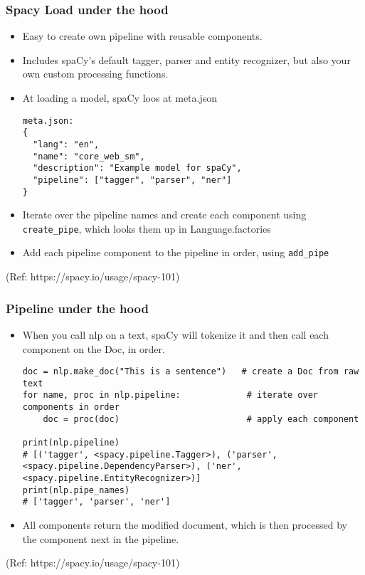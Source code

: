 \begin{frame}[fragile]\frametitle{Spacy Load under the hood}
  \begin{itemize}
    \item Easy to create own pipeline with reusable components.
		\item Includes spaCy’s default tagger, parser and entity recognizer, but also your own custom processing functions.
		\item At loading a model, spaCy loos at meta.json
		\begin{lstlisting}
meta.json:
{
  "lang": "en",
  "name": "core_web_sm",
  "description": "Example model for spaCy",
  "pipeline": ["tagger", "parser", "ner"]
}
\end{lstlisting}

\item Iterate over the pipeline names and create each component using \lstinline|create_pipe|, which looks them up in Language.factories
\item Add each pipeline component to the pipeline in order, using \lstinline|add_pipe|

  \end{itemize}
	
	
{\tiny (Ref: https://spacy.io/usage/spacy-101)}
\end{frame}

\begin{frame}[fragile]\frametitle{Pipeline under the hood}
  \begin{itemize}
    \item When you call nlp on a text, spaCy will tokenize it and then call each component on the Doc, in order.
		\begin{lstlisting}
doc = nlp.make_doc("This is a sentence")   # create a Doc from raw text
for name, proc in nlp.pipeline:             # iterate over components in order
    doc = proc(doc)                         # apply each component

print(nlp.pipeline)
# [('tagger', <spacy.pipeline.Tagger>), ('parser', <spacy.pipeline.DependencyParser>), ('ner', <spacy.pipeline.EntityRecognizer>)]
print(nlp.pipe_names)
# ['tagger', 'parser', 'ner']
\end{lstlisting}

\item All components return the modified document, which is then processed by the component next in the pipeline.

  \end{itemize}
	
	
{\tiny (Ref: https://spacy.io/usage/spacy-101)}
\end{frame}

